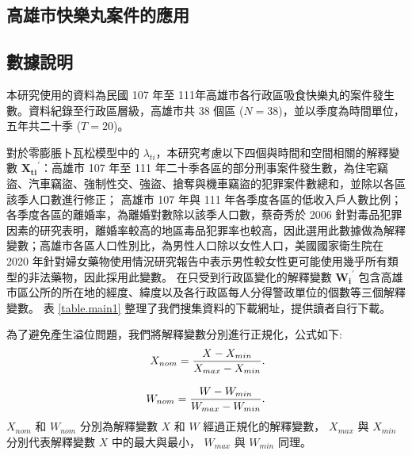 \documentclass[12pt,a4paper]{article}
\begin{document}
\begin{CJK}{UTF8}{bkai}
\section{高雄市快樂丸案件的應用}\label{sec:4}

\subsection{數據說明}\label{sec:4.1}
本研究使用的資料為民國 107 年至 111年高雄市各行政區吸食快樂丸的案件發生數。資料紀錄至行政區層級，高雄市共 38 個區 ($N=38$)，並以季度為時間單位，五年共二十季 ($T=20$)。

對於零膨脹卜瓦松模型中的 $\lambda_{ti}$，本研究考慮以下四個與時間和空間相關的解釋變數 $\bm{X_{ti}}^\prime$：高雄市 107 年至 111 年二十季各區的部分刑事案件發生數，為住宅竊盜、汽車竊盜、強制性交、強盜、搶奪與機車竊盜的犯罪案件數總和，並除以各區該季人口數進行修正；
高雄市 107 年與 111 年各季度各區的低收入戶人數比例；各季度各區的離婚率，為離婚對數除以該季人口數，蔡奇秀於 2006 針對毒品犯罪因素的研究表明，離婚率較高的地區毒品犯罪率也較高，因此選用此數據做為解釋變數；高雄市各區人口性別比，為男性人口除以女性人口，美國國家衛生院在 2020 年針對婦女藥物使用情況研究報告中表示男性較女性更可能使用幾乎所有類型的非法藥物，因此採用此變數。
在只受到行政區變化的解釋變數 $\bm{W_{i}}^\prime$ 包含高雄市區公所的所在地的經度、緯度以及各行政區每人分得警政單位的個數等三個解釋變數。
表 \ref{table.main1} 整理了我們搜集資料的下載網址，提供讀者自行下載。

為了避免產生溢位問題，我們將解釋變數分別進行正規化，公式如下:
\begin{equation*}
\setlength\abovedisplayskip{25pt}
\setlength\belowdisplayskip{25pt}
\begin{split}
X_{nom} = \frac{X-X_{min}}{X_{max}-X_{min}}.\\[3mm]
W_{nom} = \frac{W-W_{min}}{W_{max}-W_{min}}.
\end{split}
\end{equation*}
 $X_{nom}$ 和 $W_{nom}$ 分別為解釋變數 $X$ 和 $W$ 經過正規化的解釋變數， $X_{max}$ 與 $X_{min}$ 分別代表解釋變數 $X$ 中的最大與最小， $W_{max}$ 與 $W_{min}$ 同理。


\end{CJK}
\end{document}
